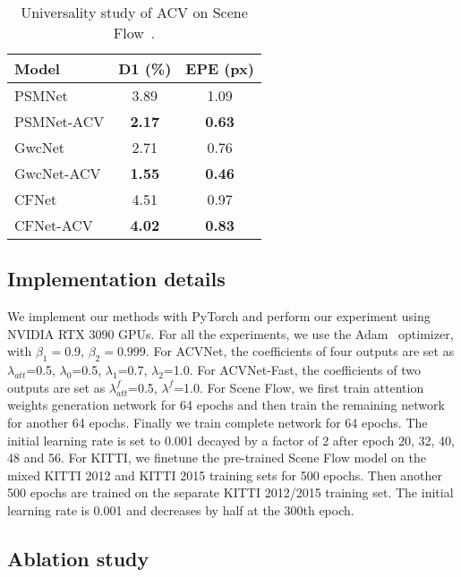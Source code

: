 \documentclass[10pt,twocolumn,letterpaper]{article}
\begin{document}
\begin{table} 
\begin{center}
\begin{tabular}{l|c|c}
\hline
Model  & D1 (\%) & EPE (px)\\ 
\hline
PSMNet~\cite{chang2018pyramid} & 3.89 & 1.09 \\
PSMNet-ACV & \textbf{2.17} & \textbf{0.63} \\
\hline
GwcNet~\cite{guo2019group} & 2.71 & 0.76 \\
GwcNet-ACV & \textbf{1.55} & \textbf{0.46} \\
\hline
CFNet~\cite{shen2021cfnet} & 4.51 & 0.97 \\
CFNet-ACV & \textbf{4.02} & \textbf{0.83} \\
\hline
\end{tabular}
\end{center}
\vspace{-10pt}
\caption{Universality study of ACV on Scene Flow~\cite{dispNetC2016large}.}\label{tab:universality}
\vspace{-10pt}
\end{table}

\subsection{Implementation details} \label{sec:Implementation details}
We implement our methods with PyTorch and perform our experiment using NVIDIA RTX 3090 GPUs. For all the experiments, we use the Adam~\cite{kingma2014adam} optimizer, with $\beta_1=0.9$, $\beta_2=0.999$. For ACVNet, the coefficients of four outputs are set as $\lambda_{att}$=0.5, $\lambda_{0}$=0.5, $\lambda_{1}$=0.7, $\lambda_{2}$=1.0. For ACVNet-Fast, the coefficients of two outputs are set as $\lambda_{att}^f$=0.5, $\lambda^{f}$=1.0. For Scene Flow, we first train attention weights generation network for 64 epochs and then train the remaining network for another 64 epochs. Finally we train complete network for 64 epochs. The initial learning rate is set to 0.001 decayed by a factor of 2 after epoch 20, 32, 40, 48 and 56. For KITTI, we finetune the pre-trained Scene Flow model on the mixed KITTI 2012 and KITTI 2015 training sets for 500 epochs. Then another 500 epochs are trained on the separate KITTI 2012/2015 training set. The initial learning rate is 0.001 and decreases by half at the 300th epoch.



\subsection{Ablation study} \label{sec:Ablation study}
\end{document}
